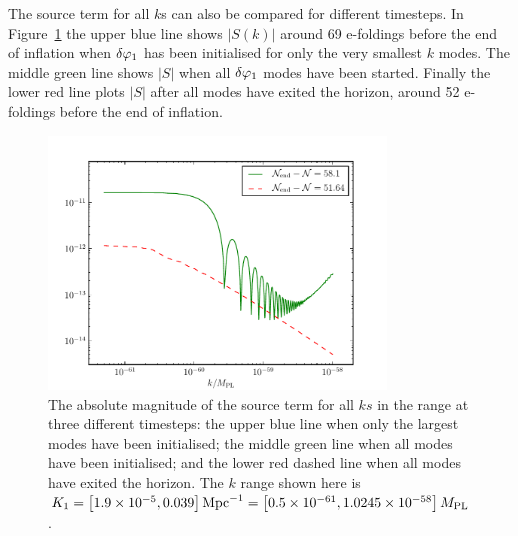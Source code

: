 The source term for all $k$s can also be compared for different timesteps. In
Figure~\ref{fig:src-3ns} the upper blue line shows $|S(k)|$ around 69 e-foldings
before the end of
inflation when $\delta\varphi_{1}$ has been initialised for only the very smallest $k$
modes. The middle green
line shows $|S|$ when all $\delta\varphi_{1}$ modes have been started. Finally the lower red
line plots $|S|$
after all modes have exited the horizon, around 52 e-foldings before the end of
inflation.
% 
\begin{figure}
\centering
\includegraphics[width=0.8\textwidth]{numerical/graphs/src_3ns-large}
\caption[Source term at three different times]{The absolute magnitude of the source 
term for all $ks$ in the range at three different timesteps: the upper blue line when
only the largest modes have been initialised; the middle green line when all modes
have been initialised; and the lower red dashed line when all modes have
exited the horizon. The $k$ range shown here is $K_1=\left[ 1.9\times 10^{-5}, 0.039
\right] \mathrm{Mpc}^{-1}= \left[0.5\times 10^{-61}, 1.0245\times 10^{-58}\right]M_{\mathrm{PL}}$.}
\label{fig:src-3ns}
\end{figure}
% 





